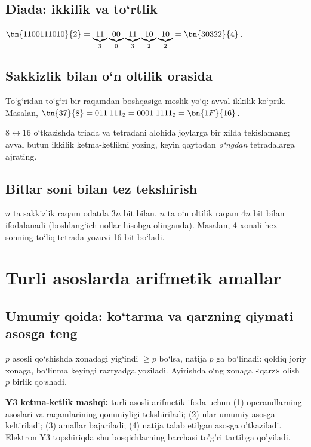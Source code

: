 \documentclass[11pt,a4paper,openany,oneside]{book}
\begin{document}
\section{Diada: ikkilik va to‘rtlik}
\(\bn{1100111010}{2}=\underbrace{11}_{3}\underbrace{00}_{0}\underbrace{11}_{3}\underbrace{10}_{2}\underbrace{10}_{2}=\bn{30322}{4}\).
\section{Sakkizlik bilan o‘n oltilik orasida}
To‘g‘ridan-to‘g‘ri bir raqamdan boshqasiga moslik yo‘q: avval ikkilik ko‘prik. Masalan, \(\bn{37}{8}=011\;111_2=0001\;1111_2=\bn{1F}{16}\).
\begin{mistake}
\(8\leftrightarrow16\) o‘tkazishda triada va tetradani alohida joylarga bir xilda tekislamang; avval butun ikkilik ketma-ketlikni yozing, keyin qaytadan \emph{o‘ngdan} tetradalarga ajrating.
\end{mistake}
\section{Bitlar soni bilan tez tekshirish}
\(n\) ta sakkizlik raqam odatda 3\(n\) bit bilan, \(n\) ta o‘n oltilik raqam 4\(n\) bit bilan ifodalanadi (boshlang‘ich nollar hisobga olinganda). Masalan, 4 xonali hex sonning to‘liq tetrada yozuvi 16 bit bo‘ladi.

\chapter{Turli asoslarda arifmetik amallar}
\section{Umumiy qoida: ko‘tarma va qarzning qiymati asosga teng}
\begin{definition}
\(p\) asosli qo‘shishda xonadagi yig‘indi \(\ge p\) bo‘lsa, natija \(p\) ga bo‘linadi: qoldiq joriy xonaga, bo‘linma keyingi razryadga yoziladi. Ayirishda o‘ng xonaga «qarz» olish \(p\) birlik qo‘shadi. 
\end{definition}
\begin{important}
\textbf{Y3 ketma-ketlik mashqi:} turli asosli arifmetik ifoda uchun (1) operandlarning asoslari va raqamlarining qonuniyligi tekshiriladi; (2) ular umumiy asosga keltiriladi; (3) amallar bajariladi; (4) natija talab etilgan asosga o'tkaziladi. Elektron Y3 topshiriqda shu bosqichlarning barchasi to'g'ri tartibga qo'yiladi. 
\end{important}
\end{document}
